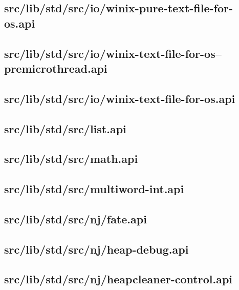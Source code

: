 \subsection{src/lib/std/src/io/winix-pure-text-file-for-os.api}


\subsection{src/lib/std/src/io/winix-text-file-for-os--premicrothread.api}


\subsection{src/lib/std/src/io/winix-text-file-for-os.api}


\subsection{src/lib/std/src/list.api}


\subsection{src/lib/std/src/math.api}


\subsection{src/lib/std/src/multiword-int.api}


\subsection{src/lib/std/src/nj/fate.api}


\subsection{src/lib/std/src/nj/heap-debug.api}


\subsection{src/lib/std/src/nj/heapcleaner-control.api}


